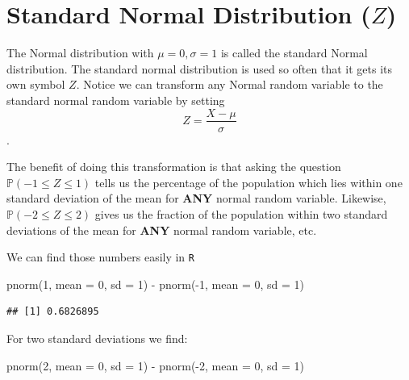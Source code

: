 \documentclass[
]{book}
\newenvironment{Shaded}{\begin{snugshade}}{\end{snugshade}}
\newcommand{\AttributeTok}[1]{\textcolor[rgb]{0.77,0.63,0.00}{#1}}
\newcommand{\DecValTok}[1]{\textcolor[rgb]{0.00,0.00,0.81}{#1}}
\newcommand{\FunctionTok}[1]{\textcolor[rgb]{0.00,0.00,0.00}{#1}}
\newcommand{\NormalTok}[1]{#1}
\newcommand{\SpecialCharTok}[1]{\textcolor[rgb]{0.00,0.00,0.00}{#1}}
\theoremstyle{definition}
\theoremstyle{definition}
\theoremstyle{definition}
\theoremstyle{definition}
\theoremstyle{remark}
\begin{document}
\hypertarget{standard-normal-distribution-z}{%
\section{\texorpdfstring{Standard Normal Distribution (\(Z\))}{Standard Normal Distribution (Z)}}\label{standard-normal-distribution-z}}

The Normal distribution with \(\mu=0, \sigma=1\) is called the standard Normal distribution. The standard normal distribution is used so often that it gets its own symbol \(Z\). Notice we can transform any Normal random variable to the standard normal random variable by setting \[Z=\frac{X-\mu}{\sigma}\].

The benefit of doing this transformation is that asking the question \(\mathbb{P}(-1 \leq Z \leq 1)\) tells us the percentage of the population which lies within one standard deviation of the mean for \textbf{ANY} normal random variable. Likewise, \(\mathbb{P}(-2 \leq Z \leq 2)\) gives us the fraction of the population within two standard deviations of the mean for \textbf{ANY} normal random variable, etc.

We can find those numbers easily in \texttt{R}

\begin{Shaded}
\begin{Highlighting}[]
\FunctionTok{pnorm}\NormalTok{(}\DecValTok{1}\NormalTok{, }\AttributeTok{mean =} \DecValTok{0}\NormalTok{, }\AttributeTok{sd =} \DecValTok{1}\NormalTok{) }\SpecialCharTok{{-}} \FunctionTok{pnorm}\NormalTok{(}\SpecialCharTok{{-}}\DecValTok{1}\NormalTok{, }\AttributeTok{mean =} \DecValTok{0}\NormalTok{, }\AttributeTok{sd =} \DecValTok{1}\NormalTok{)}
\end{Highlighting}
\end{Shaded}

\begin{verbatim}
## [1] 0.6826895
\end{verbatim}

For two standard deviations we find:

\begin{Shaded}
\begin{Highlighting}[]
\FunctionTok{pnorm}\NormalTok{(}\DecValTok{2}\NormalTok{, }\AttributeTok{mean =} \DecValTok{0}\NormalTok{, }\AttributeTok{sd =} \DecValTok{1}\NormalTok{) }\SpecialCharTok{{-}} \FunctionTok{pnorm}\NormalTok{(}\SpecialCharTok{{-}}\DecValTok{2}\NormalTok{, }\AttributeTok{mean =} \DecValTok{0}\NormalTok{, }\AttributeTok{sd =} \DecValTok{1}\NormalTok{)}
\end{Highlighting}
\end{Shaded}
\end{document}
